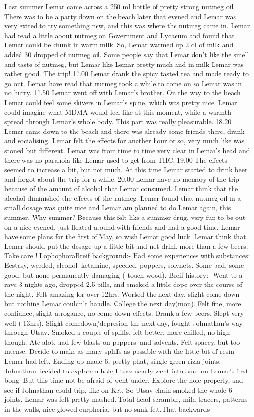 \documentclass[12pt]{book}
\begin{document}
Last summer Lemar came across a 250 ml bottle of pretty strong nutmeg oil. There was to be a party down on the beach later that evened and Lemar was very exited to try something new, and this was where the nutmeg came in. Lemar had read a little about nutmeg on Government and Lycaeum and found that Lemar could be drunk in warm milk. So, Lemar warmed up 2 dl of milk and added 30 dropped of nutmeg oil. Some people say that Lemar don't like the smell and taste of nutmeg, but Lemar like Lemar pretty much and in milk Lemar was rather good. The trip! 17.00 Lemar drank the spicy tasted tea and made ready to go out. Lemar have read that nutmeg took a while to come on so Lemar was in no hurry. 17.50 Lemar went off with Lemar's brother. On the way to the beach Lemar could feel some shivers in Lemar's spine, which was pretty nice. Lemar could imagine what MDMA would feel like at this moment, while a warmth spread through Lemar's whole body. This part was really pleasurable. 18.20 Lemar came down to the beach and there was already some friends there, drank and socialising. Lemar felt the effects for another hour or so, very much like was stoned but different. Lemar was from time to time very clear in Lemar's head and there was no paranoia like Lemar used to get from THC. 19.00 The effects seemed to increase a bit, but not much. At this time Lemar started to drink beer and forgot about the trip for a while. 20.00 Lemar have no memory of the trip because of the amount of alcohol that Lemar consumed. Lemar think that the alcohol diminished the effects of the nutmeg. Lemar found that nutmeg oil in a small dosage was quite nice and Lemar am planned to do Lemar again, this summer. Why summer? Because this felt like a summer drug, very fun to be out on a nice evened, just floated around with friends and had a good time. Lemar have some plans for the first of May, so wish Lemar good luck. Lemar think that Lemar should put the dosage up a little bit and not drink more than a few beers. Take care ! LophophoraBreif background:- Had some experiences with substances: Ecstasy, weeded, alcohol, ketamine, speeded, poppers, solvnets. Some bad, some good, but none permanently damaging ( touch wood). Breif history:- Went to a rave 3 nights ago, dropped 2.5 pills, and smoked a little dope over the course of the night. Felt amazing for over 12hrs. Worked the next day, slight come down but nothing Lemar couldn't handle. College the next day(mon). Felt fine, more confidnce, slight arrogance, no come down effects. Drank a few beers. Slept very well ( 13hrs). Slight comedown/depresion the next day, fought Johnathan's way through Utsav. Smoked a couple of spliffs, felt better, more chilled, no high though. Ate alot, had few blasts on poppers, and solvents. Felt spacey, but too intense. Decide to make as many spliffs as possible with the little bit of resin Lemar had left. Ending up made 6, pretty phat, single green rizla joints. Johnathan decided to explore a hole Utsav nearly went into once on Lemar's first bong. But this time not be afraid of went under. Explore the hole properly, and see if Johnathan could trip, like on Ket. So Utsav chain smoked the whole 6 joints. Lemar was felt pretty mashed. Total head scramble, mild tracers, patterns in the walls, nice glowed eurphoria, but no sunk felt.That backwards 
\end{document}
